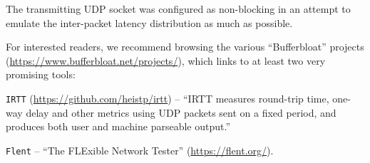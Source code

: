 The transmitting UDP socket was configured as non-blocking in an attempt to
emulate the inter-packet latency distribution as much as possible.

For interested readers, we recommend browsing the various
``Bufferbloat'' projects (\url{https://www.bufferbloat.net/projects/}), which
links to at least two very promising tools:

\texttt{IRTT} (\url{https://github.com/heistp/irtt}) -- ``IRTT measures round-trip time,
one-way delay and other metrics using UDP packets sent on a fixed period, and
produces both user and machine parseable output.''

\texttt{Flent} -- ``The FLExible Network Tester'' (\url{https://flent.org/}).
